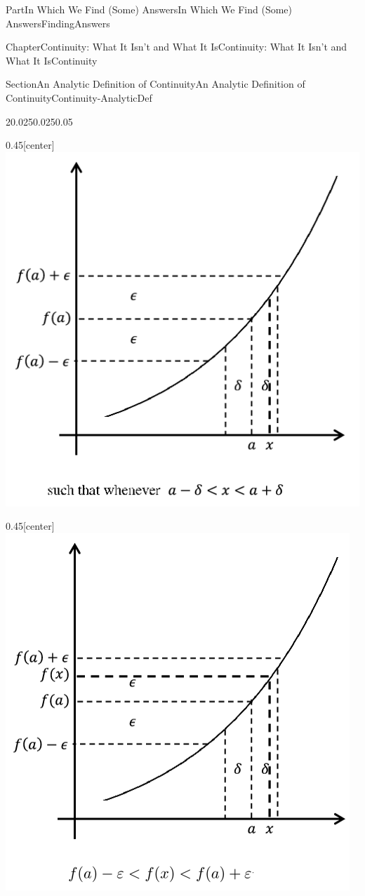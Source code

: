 \documentclass[oneside,10pt,]{book}
\numberwithin{equation}{part}
\begin{document}
\begin{partptx}{Part}{In Which We Find (Some) Answers}{}{In Which We Find (Some) Answers}{}{}{FindingAnswers}
\begin{chapterptx}{Chapter}{Continuity: What It Isn't and What It Is}{}{Continuity: What It Isn't and What It Is}{}{}{Continuity}
\begin{sectionptx}{Section}{An Analytic Definition of Continuity}{}{An Analytic Definition of Continuity}{}{}{Continuity-AnalyticDef}
\begin{sidebyside}{2}{0.025}{0.025}{0.05}
\begin{sbspanel}{0.45}[center]
\includegraphics[width=\linewidth]{external/images/Ch5fig3c.png}
\end{sbspanel}%
\begin{sbspanel}{0.45}[center]%
\includegraphics[width=\linewidth]{external/images/Ch5fig3d.png}

\end{sbspanel}
\end{sidebyside}
\end{sectionptx}
\end{chapterptx}
\end{partptx}
\end{document}
